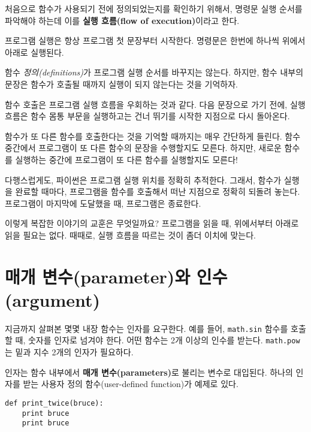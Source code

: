 처음으로 함수가 사용되기 전에 정의되었는지를 확인하기 위해서, 
명령문 실행 순서를 파악해야 하는데 이를 {\bf 실행 흐름(flow of execution)}이라고 한다.

프로그램 실행은 항상 프로그램 첫 문장부터 시작한다. 
명령문은 한번에 하나씩 위에서 아래로 실행된다.

함수 \emph{정의(definitions)}가 프로그램 실행 순서를 바꾸지는 않는다. 
하지만, 함수 내부의 문장은 함수가 호출될 때까지 실행이 되지 않는다는 것을 기억하자.

함수 호출은 프로그램 실행 흐름을 우회하는 것과 같다. 
다음 문장으로 가기 전에, 실행 흐름은 함수 몸통 부문을 실행하고는 건너 뛰기를 시작한 지점으로 다시 돌아온다.

함수가 또 다른 함수를 호출한다는 것을 기억할 때까지는 매우 간단하게 들린다.
함수 중간에서 프로그램이 또 다른 함수의 문장을 수행할지도 모른다. 
하지만, 새로운 함수를 실행하는 중간에 프로그램이 또 다른 함수를 실행할지도 모른다!

다행스럽게도, 파이썬은 프로그램 실행 위치를 정확히 추적한다. 
그래서, 함수가 실행을 완료할 때마다, 프로그램을 함수를 호출해서 떠난 지점으로 정확히 되돌려 놓는다. 
프로그램이 마지막에 도달했을 때, 프로그램은 종료한다.

이렇게 복잡한 이야기의 교훈은 무엇일까요? 
프로그램을 읽을 때, 위에서부터 아래로 읽을 필요는 없다. 
때때로, 실행 흐름을 따르는 것이 좀더 이치에 맞는다.

\section{매개 변수(parameter)와 인수(argument)}
\label{parameters}

지금까지 살펴본 몇몇 내장 함수는 인자를 요구한다. 
예를 들어, {\tt math.sin} 함수를 호출할 때, 숫자를 인자로 넘겨야 한다.
어떤 함수는 2개 이상의 인수를 받는다. {\tt math.pow} 는 밑과 지수 2개의 인자가 필요하다. 

인자는 함수 내부에서 {\bf 매개 변수(parameters)}로 불리는 변수로 대입된다.
하나의 인자를 받는 사용자 정의 함수(user-defined function)가 예제로 있다.


\beforeverb
\begin{verbatim}
def print_twice(bruce):
    print bruce
    print bruce
\end{verbatim}
\afterverb
%

